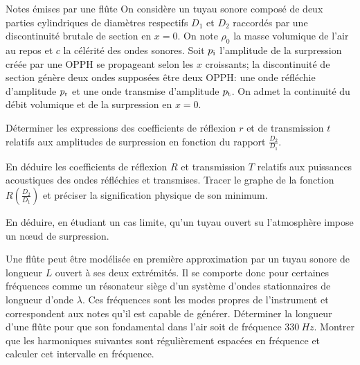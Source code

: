 \begin{exo}[PC]{Notes émises par une flûte}
On considère un tuyau sonore composé de deux parties cylindriques de diamètres respectifs $D_1$ et $D_2$ raccordés par une discontinuité brutale de section en $x=0$. On note $\rho_0$ la masse volumique de l'air au repos et $c$ la célérité des ondes sonores. Soit $p_{\rm{i}}$ l'amplitude de la surpression créée par une OPPH se propageant selon les $x$ croissants; la discontinuité de section génère deux ondes supposées être deux OPPH: une onde réfléchie d'amplitude $p_{\rm{r}}$ et une onde transmise d'amplitude $p_{\rm{t}}$. On admet la continuité du débit volumique et de la surpression en $x=0$.
\begin{quest}
\item Déterminer les expressions des coefficients de réflexion $r$ et de transmission $t$ relatifs aux amplitudes de surpression en fonction du rapport $\frac{D_2}{D_1}$.
\item En déduire les coefficients de réflexion $R$ et transmission $T$ relatifs aux puissances acoustiques des ondes réfléchies et transmises. Tracer le graphe de la fonction $R(\frac{D_2}{D_1})$ et préciser la signification physique de son minimum.
\item En déduire, en étudiant un cas limite, qu'un tuyau ouvert su l'atmosphère impose un nœud de surpression.
\item Une flûte peut être modélisée en première approximation par un tuyau sonore de longueur $L$ ouvert à ses deux extrémités. Il se comporte donc pour certaines fréquences comme un résonateur siège d'un système d'ondes stationnaires de longueur d'onde $\lambda$. Ces fréquences sont les modes propres de l'instrument et correspondent aux notes qu'il est capable de générer. Déterminer la longueur d'une flûte pour que son fondamental dans l'air soit de fréquence $\SI{330}{Hz}$. Montrer que les harmoniques suivantes sont régulièrement espacées en fréquence et calculer cet intervalle en fréquence.
\end{quest}
\end{exo}


